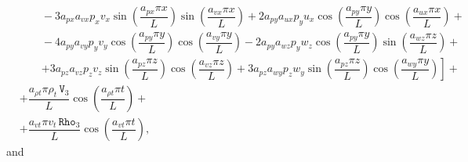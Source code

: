 \documentclass[10pt]{article}
\newcommand{\Rho}{\,\mathtt{Rho}}
\newcommand{\V}{\,\mathtt{V}}
\begin{document}
\begin{equation}
\begin{split}
    &\qquad-3 a_{px} a_{vx} p_x v_x \sin\left(\dfrac{a_{px} \pi x}{L}\right) \sin\left(\dfrac{a_{vx} \pi x}{L}\right)+2 a_{py} a_{ux} p_y u_x \cos\left(\dfrac{a_{py} \pi y}{L}\right) \cos\left(\dfrac{a_{ux} \pi x}{L}\right)+\\
    &\qquad-4 a_{py} a_{vy} p_y v_y \cos\left(\dfrac{a_{py} \pi y}{L}\right) \cos\left(\dfrac{a_{vy} \pi y}{L}\right)-2 a_{py} a_{wz} p_y w_z \cos\left(\dfrac{a_{py} \pi y}{L}\right) \sin\left(\dfrac{a_{wz} \pi z}{L}\right)+\\
    &\qquad\left.+3 a_{pz}a_{vz} p_z  v_z \sin\left(\dfrac{a_{pz} \pi z}{L}\right) \cos\left(\dfrac{a_{vz} \pi z}{L}\right)+3 a_{pz} a_{wy} p_z w_y \sin\left(\dfrac{a_{pz} \pi z}{L}\right) \cos\left(\dfrac{a_{wy} \pi y}{L}\right)\right]+\\
&+\dfrac{a_{\rho t} \pi \rho_t \V_3 }{L}\cos\left(\dfrac{a_{\rho t} \pi t}{L}\right)+\\
&+ \dfrac{a_{vt} \pi v_t  \Rho_3}{L}\cos\left(\dfrac{a_{vt} \pi t}{L}\right) ,
 \end{split}
\end{equation}
and
\end{document}
